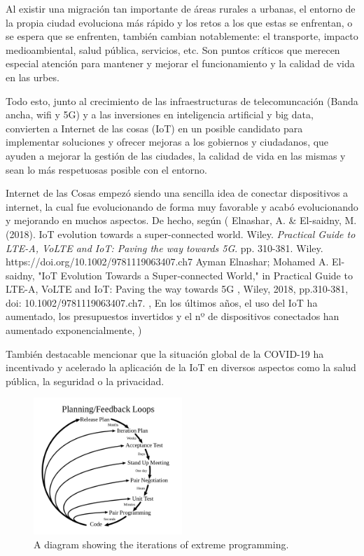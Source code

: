 \documentclass[12pt, a4paper, twoside]{article}
\begin{document}
Al existir una migración tan importante de áreas rurales a urbanas, el entorno de la
propia ciudad evoluciona más rápido y los retos a los que estas se enfrentan, o se espera que se enfrenten,
también cambian notablemente: el transporte, impacto medioambiental, salud pública, servicios, etc. Son puntos
críticos que merecen especial atención para mantener y mejorar el funcionamiento y la calidad de vida en
las urbes.

Todo esto, junto al crecimiento de las infraestructuras de telecomuncación (Banda ancha, wifi y 5G)
y a las inversiones en inteligencia artificial y big data, convierten  a Internet de las cosas (IoT)
 en un posible candidato para implementar soluciones y ofrecer mejoras a los gobiernos y ciudadanos, 
que ayuden a mejorar la gestión de las ciudades, la calidad de vida en las mismas y 
sean lo más respetuosas posible con el entorno.

Internet de las Cosas empezó siendo una sencilla idea de conectar dispositivos a
internet, la cual fue evolucionando de forma muy favorable y acabó evolucionando y 
mejorando en muchos aspectos. De hecho, según (
    Elnashar, A. \& El-saidny, M. (2018). IoT evolution towards a super-connected world. Wiley. \textit{Practical Guide to LTE-A, VoLTE and IoT: Paving the way towards 5G}. pp. 310-381. Wiley. https://doi.org/10.1002/9781119063407.ch7
  Ayman Elnashar; Mohamed A. El-saidny, "IoT Evolution Towards a Super‐connected World," in Practical Guide to LTE-A, VoLTE and IoT: Paving the way towards 5G , Wiley, 2018, pp.310-381, doi: 10.1002/9781119063407.ch7.
  , En los últimos años, el uso del IoT ha aumentado, los presupuestos 
  invertidos y el nº de dispositivos conectados han aumentado exponencialmente,
  )

También destacable mencionar que la situación global de la COVID-19 ha incentivado
y acelerado la aplicación de la IoT en diversos aspectos como la salud pública,
la seguridad o la privacidad.

    \begin{figure}[h]
      \centering
        \includegraphics[width=0.5\textwidth]{xp}
      \caption{A diagram showing the iterations of extreme programming.}
    \end{figure}
    
\end{document}

